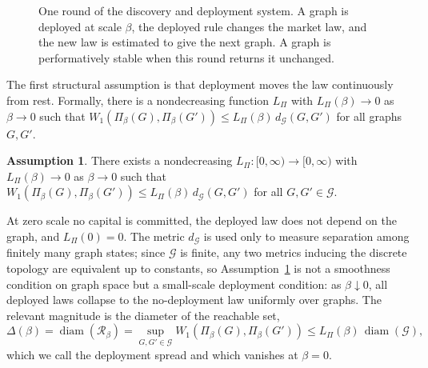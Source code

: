 \documentclass[11pt]{article}
\theoremstyle{plain}
\theoremstyle{definition}
\newtheorem{assumption}{Assumption}
\newcommand{\Gcal}{\mathcal{G}}
\newcommand{\Rset}{\mathcal{R}}
\newcommand{\Wone}{W_1}
\newcommand{\Pidep}{\Pi_\beta}
\newcommand{\diam}{\operatorname{diam}}
\begin{document}
\begin{figure}[t]
\centering
{}
\caption{One round of the discovery and deployment system. A graph is deployed at scale $\beta$, the deployed rule changes the market law, and the new law is estimated to give the next graph. A graph is performatively stable when this round returns it unchanged.}
\label{fig:loop}
\end{figure}

The first structural assumption is that deployment moves the law continuously from rest. Formally, there is a nondecreasing function $L_\Pi$ with $L_\Pi(\beta)\to0$ as $\beta\to0$ such that $\Wone(\Pidep(G),\Pidep(G'))\le L_\Pi(\beta)\,d_\Gcal(G,G')$ for all graphs $G,G'$.

\begin{assumption}\label{ass:A1}
There exists a nondecreasing $L_\Pi:[0,\infty)\to[0,\infty)$ with $L_\Pi(\beta)\to0$ as $\beta\to0$ such that $\Wone(\Pidep(G),\Pidep(G'))\le L_\Pi(\beta)\,d_\Gcal(G,G')$ for all $G,G'\in\Gcal$.
\end{assumption}

At zero scale no capital is committed, the deployed law does not depend on the graph, and $L_\Pi(0)=0$. The metric $d_\Gcal$ is used only to measure separation among finitely many graph states; since $\Gcal$ is finite, any two metrics inducing the discrete topology are equivalent up to constants, so Assumption~\ref{ass:A1} is not a smoothness condition on graph space but a small-scale deployment condition: as $\beta\downarrow0$, all deployed laws collapse to the no-deployment law uniformly over graphs. The relevant magnitude is the diameter of the reachable set,
\begin{equation}\label{eq:spread}
\Delta(\beta)=\diam(\Rset_\beta)=\sup_{G,G'\in\Gcal}\Wone(\Pidep(G),\Pidep(G'))\le L_\Pi(\beta)\,\diam(\Gcal),
\end{equation}
which we call the deployment spread and which vanishes at $\beta=0$.
\end{document}
